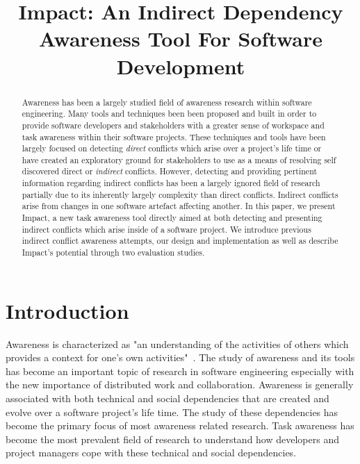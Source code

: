 \documentclass[conference]{IEEEtran}
\begin{document}
\title{Impact: An Indirect Dependency Awareness Tool For Software Development}

\author{
\and
{}
}

\maketitle

\begin{abstract}
Awareness has been a largely studied field of awareness research within
software engineering. Many tools and techniques been been proposed and built
in order to provide software developers and stakeholders with a greater
sense of workspace and task awareness within their software projects. These
techniques and tools have been largely focused on detecting \textit{direct} 
conflicts which arise over a project's life time or have created 
an exploratory ground for stakeholders to use as a means of resolving self
discovered direct or \textit{indirect} conflicts. However, detecting 
and providing pertinent information regarding indirect conflicts has been
a largely ignored field of research partially due to its inherently largely
complexity than direct conflicts. Indirect conflicts arise from changes
in one software artefact affecting another. In this paper, we present
Impact, a new task awareness tool directly aimed at both detecting
and presenting indirect conflicts which arise inside of a software project.
We introduce previous indirect conflict awareness attempts, our design 
and implementation as well as describe Impact's potential through
two evaluation studies. 
\end{abstract}


\section{Introduction}

Awareness is characterized as "an understanding of the activities of others
which provides a context for one's own activities"~\cite{Dourish:1992:ACS}.
The study of awareness and its tools has become an important topic of
research in software engineering especially with the new importance of
distributed work and collaboration. Awareness is generally associated with
both technical and social dependencies that are created and evolve over
a software project's life time. The study of these dependencies has become
the primary focus of most awareness related research. Task awareness has
become the most prevalent field of research to understand how developers and
project managers cope with these technical and social dependencies.\\
\end{document}
